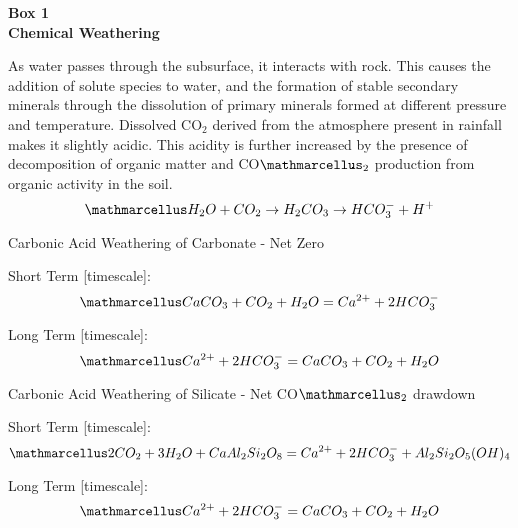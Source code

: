 \begin{tcolorbox}[
    colback=customcolor, %
    colframe=white,      %
    sharp corners,       %
    boxrule=0pt,         %
    breakable,           %
    width=\dimexpr\textwidth+2cm\relax, %
    enlarge left by=-1cm,   %
    leftrule=0mm,        %
    rightrule=0mm,       %
    toprule=0mm,         %
    bottomrule=0mm       %
]
\textbf{\Large Box 1}
\vspace{-3mm}
\myline\\
\textbf{\Large Chemical Weathering}
\vspace{-3mm}
\myline\\
{\footnotesize
As water passes through the subsurface, it interacts with rock. This causes the addition of solute species to water, and the formation of stable secondary minerals through the dissolution of primary minerals formed at different pressure and temperature. Dissolved CO$_2$ derived from the atmosphere present in rainfall makes it slightly acidic. This acidity is further increased by the presence of decomposition of organic matter and CO$\ttmath{_2}$ production from organic activity in the soil.
\[
\ttmath{H_2O + CO_2 \rightarrow H_2CO_3 \rightarrow HCO_3^- + H^+}
\]

Carbonic Acid Weathering of Carbonate - Net Zero
    
    \begin{center}
    
    Short Term [timescale]:
    \[
    \ttmath{CaCO_3 + CO_2 + H_2O = Ca^{2+} + 2HCO_3^-}
    \]
    
    Long Term [timescale]:
    \[
    \ttmath{Ca^{2+} + 2HCO_3^- = CaCO_3 + CO_2 + H_2O}
    \]

    \end{center}
    
    
Carbonic Acid Weathering of Silicate - Net CO$\ttmath{_2}$ drawdown

    \begin{center}

    Short Term [timescale]:
    \[
    \ttmath{2CO_2 + 3H_2O + CaAl_2Si_2O_8 = Ca^{2+} + 2HCO_3^- + Al_2Si_2O_5(OH)_4}
    \]
    
    Long Term [timescale]:
    \[
    \ttmath{Ca^{2+} + 2HCO_3^- = CaCO_3 + CO_2 + H_2O}
    \]
    

\end{center}}
\end{tcolorbox}
